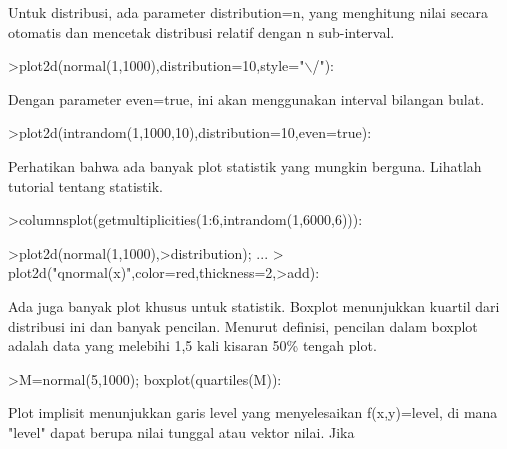 \documentclass[12pt,arial,letterpaper]{book}
\begin{document}
\begin{eulernootebook}
\begin{eulercomment}
\begin{eulercomment}
\begin{eulernootebook}
\begin{eulercomment}
\begin{eulercomment}
\begin{eulercomment}
\begin{eulercomment}
\begin{eulercomment}
\begin{eulercomment}
\begin{eulercomment}
\begin{eulernotebook}
\begin{eulercomment}
\begin{eulercomment}
\begin{eulercomment}
\begin{eulercomment}
\begin{eulercomment}
Untuk distribusi, ada parameter distribution=n, yang menghitung nilai
secara otomatis dan mencetak distribusi relatif dengan n sub-interval.
\end{eulercomment}
\begin{eulerprompt}
>plot2d(normal(1,1000),distribution=10,style="\(\backslash\)/"):
\end{eulerprompt}
\begin{eulercomment}
Dengan parameter even=true, ini akan menggunakan interval bilangan
bulat.
\end{eulercomment}
\begin{eulerprompt}
>plot2d(intrandom(1,1000,10),distribution=10,even=true):
\end{eulerprompt}
\begin{eulercomment}
Perhatikan bahwa ada banyak plot statistik yang mungkin berguna.
Lihatlah tutorial tentang statistik.
\end{eulercomment}
\begin{eulerprompt}
>columnsplot(getmultiplicities(1:6,intrandom(1,6000,6))):
\end{eulerprompt}
\begin{eulerprompt}
>plot2d(normal(1,1000),>distribution); ...
>  plot2d("qnormal(x)",color=red,thickness=2,>add):
\end{eulerprompt}
\begin{eulercomment}
Ada juga banyak plot khusus untuk statistik. Boxplot menunjukkan
kuartil dari distribusi ini dan banyak pencilan. Menurut definisi,
pencilan dalam boxplot adalah data yang melebihi 1,5 kali kisaran 50\%
tengah plot.
\end{eulercomment}
\begin{eulerprompt}
>M=normal(5,1000); boxplot(quartiles(M)):
\end{eulerprompt}
\begin{eulercomment}
Plot implisit menunjukkan garis level yang menyelesaikan f(x,y)=level,
di mana "level" dapat berupa nilai tunggal atau vektor nilai. Jika

\end{eulercomment}
\end{eulercomment}
\end{eulercomment}
\end{eulercomment}
\end{eulercomment}
\end{eulernotebook}
\end{eulercomment}
\end{eulercomment}
\end{eulercomment}
\end{eulercomment}
\end{eulercomment}
\end{eulercomment}
\end{eulercomment}
\end{eulernootebook}
\end{eulercomment}
\end{eulercomment}
\end{eulernootebook}
\end{document}
